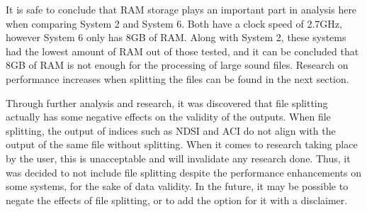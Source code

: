 It is safe to conclude that RAM storage plays an important part in analysis here when comparing System 2 and System 6. Both have a clock speed of 2.7GHz, however System 6 only has 8GB of RAM. Along with System 2, these systems had the lowest amount of RAM out of those tested, and it can be concluded that 8GB of RAM is not enough for the processing of large sound files. Research on performance increases when splitting the files can be found in the next section.\par
Through further analysis and research, it was discovered that file splitting actually has some negative effects on the validity of the outputs. When file splitting, the output of indices such as NDSI and ACI do not align with the output of the same file without splitting. When it comes to research taking place by the user, this is unacceptable and will invalidate any research done. Thus, it was decided to not include file splitting despite the performance enhancements on some systems, for the sake of data validity. In the future, it may be possible to negate the effects of file splitting, or to add the option for it with a disclaimer.

